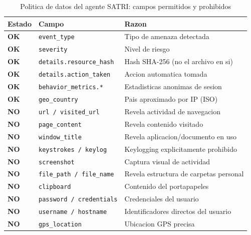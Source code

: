 \documentclass[12pt, a4paper]{report}
\begin{document}
\begin{table}[H]
\centering
\caption{Politica de datos del agente SATRI: campos permitidos y prohibidos}
\begin{tabular}{@{}p{1.5cm}p{4cm}p{6.5cm}@{}}
\toprule
\textbf{Estado} & \textbf{Campo} & \textbf{Razon} \\
\midrule
\textcolor{satriGreen}{\textbf{OK}} & \texttt{event\_type}           & Tipo de amenaza detectada \\
\textcolor{satriGreen}{\textbf{OK}} & \texttt{severity}              & Nivel de riesgo \\
\textcolor{satriGreen}{\textbf{OK}} & \texttt{details.resource\_hash} & Hash SHA-256 (no el archivo en si) \\
\textcolor{satriGreen}{\textbf{OK}} & \texttt{details.action\_taken} & Accion automatica tomada \\
\textcolor{satriGreen}{\textbf{OK}} & \texttt{behavior\_metrics.*}   & Estadisticas anonimas de sesion \\
\textcolor{satriGreen}{\textbf{OK}} & \texttt{geo\_country}          & Pais aproximado por IP (ISO) \\
\midrule
\textcolor{satriRed}{\textbf{NO}}   & \texttt{url / visited\_url}     & Revela actividad de navegacion \\
\textcolor{satriRed}{\textbf{NO}}   & \texttt{page\_content}          & Revela contenido visitado \\
\textcolor{satriRed}{\textbf{NO}}   & \texttt{window\_title}          & Revela aplicacion/documento en uso \\
\textcolor{satriRed}{\textbf{NO}}   & \texttt{keystrokes / keylog}    & Keylogging explicitamente prohibido \\
\textcolor{satriRed}{\textbf{NO}}   & \texttt{screenshot}             & Captura visual de actividad \\
\textcolor{satriRed}{\textbf{NO}}   & \texttt{file\_path / file\_name} & Revela estructura de carpetas personal \\
\textcolor{satriRed}{\textbf{NO}}   & \texttt{clipboard}              & Contenido del portapapeles \\
\textcolor{satriRed}{\textbf{NO}}   & \texttt{password / credentials} & Credenciales del usuario \\
\textcolor{satriRed}{\textbf{NO}}   & \texttt{username / hostname}    & Identificadores directos del usuario \\
\textcolor{satriRed}{\textbf{NO}}   & \texttt{gps\_location}          & Ubicacion GPS precisa \\
\bottomrule
\end{tabular}
\end{table}
\end{document}
